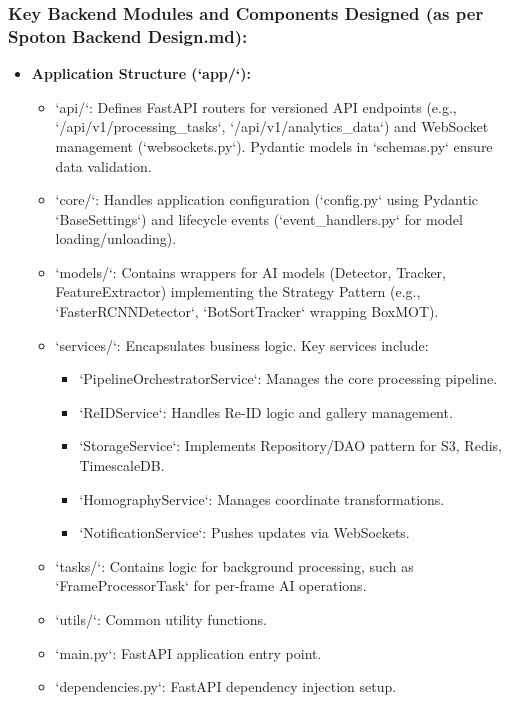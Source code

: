 \subsubsection*{Key Backend Modules and Components Designed (as per Spoton Backend Design.md):}
\begin{itemize}
    \item \textbf{Application Structure (`app/`):}
        \begin{itemize}
            \item `api/`: Defines FastAPI routers for versioned API endpoints (e.g., `/api/v1/processing\_tasks`, `/api/v1/analytics\_data`) and WebSocket management (`websockets.py`). Pydantic models in `schemas.py` ensure data validation.
            \item `core/`: Handles application configuration (`config.py` using Pydantic `BaseSettings`) and lifecycle events (`event\_handlers.py` for model loading/unloading).
            \item `models/`: Contains wrappers for AI models (Detector, Tracker, FeatureExtractor) implementing the Strategy Pattern (e.g., `FasterRCNNDetector`, `BotSortTracker` wrapping BoxMOT).
            \item `services/`: Encapsulates business logic. Key services include:
                \begin{itemize}
                    \item `PipelineOrchestratorService`: Manages the core processing pipeline.
                    \item `ReIDService`: Handles Re-ID logic and gallery management.
                    \item `StorageService`: Implements Repository/DAO pattern for S3, Redis, TimescaleDB.
                    \item `HomographyService`: Manages coordinate transformations.
                    \item `NotificationService`: Pushes updates via WebSockets.
                \end{itemize}
            \item `tasks/`: Contains logic for background processing, such as `FrameProcessorTask` for per-frame AI operations.
            \item `utils/`: Common utility functions.
            \item `main.py`: FastAPI application entry point.
            \item `dependencies.py`: FastAPI dependency injection setup.
        \end{itemize}

\end{itemize}
